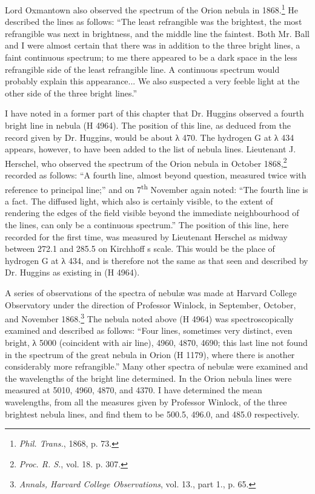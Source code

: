 \documentclass[a4paper, 12pt, oneside, polutonikogreek, english]{article}
\begin{document}
Lord Oxmantown also observed the spectrum of the Orion nebula in 1868.\footnote{\emph{Phil. Trans.}, 1868, p. 73.} He described the lines as follows: ``The least refrangible was the brightest, the most refrangible was next in brightness, and the middle line the faintest. Both Mr. Ball and I were almost certain that there was in addition to the three bright lines, a faint continuous spectrum; to me there appeared to be a dark space in the less refrangible side of the least refrangible line. A continuous spectrum would probably explain this appearance... We also suspected a very feeble light at the other side of the three bright lines.''

I have noted in a former part of this chapter that Dr. Huggins observed a fourth bright line in nebula (H 4964). The position of this line, as deduced from the record given by Dr. Huggins, would be about λ 470. The hydrogen G at λ 434 appears, however, to have been added to the list of nebula lines. Lieutenant J. Herschel, who observed the spectrum of the Orion nebula in October 1868,\footnote{\emph{Proc. R. S.}, vol. 18. p. 307.} recorded as follows: ``A fourth line, almost beyond question, measured twice with reference to principal line;'' and on 7\textsuperscript{th} November again noted: ``The fourth line is a fact. The diffused light, which also is certainly visible, to the extent of rendering the edges of the field visible beyond the immediate neighbourhood of the lines, can only be a continuous spectrum.'' The position of this line, here recorded for the first time, was measured by Lieutenant Herschel as midway between 272.1 and 285.5 on Kirchhoff s scale. This would be the place of hydrogen G at λ 434, and is therefore not the same as that seen and described by Dr. Huggins as existing in (H 4964).

A series of observations of the spectra of nebulæ was made at Harvard College Observatory under the direction of Professor Winlock, in September, October, and November 1868.\footnote{\emph{Annals, Harvard College Observations}, vol. 13., part 1., p. 65.} The nebula noted above (H 4964) was spectroscopically examined and described as follows: ``Four lines, sometimes very distinct, even bright, λ 5000 (coincident with air line), 4960, 4870, 4690; this last line not found in the spectrum of the great nebula in Orion (H 1179), where there is another considerably more refrangible.'' Many other spectra of nebulæ were examined and the wavelengths of the bright line determined. In the Orion nebula lines were measured at 5010, 4960, 4870, and 4370. I have determined the mean wavelengths, from all the measures given by Professor Winlock, of the three brightest nebula lines, and find them to be 500.5, 496.0, and 485.0 respectively.
\end{document}
